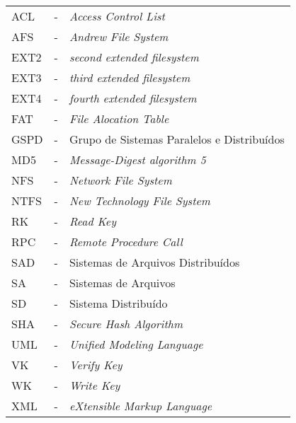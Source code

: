 \begin{tabular}{l cl}
 ACL & - & \textit{Access Control List}\\ 
 AFS & - & \textit{Andrew File System}\\ 
 EXT2 & - & \textit{second extended filesystem}\\ 
 EXT3 & - & \textit{third extended filesystem}\\ 
 EXT4 & - & \textit{fourth extended filesystem}\\ 
 FAT & - & \textit{File Alocation Table}\\ 
 GSPD & - & Grupo de Sistemas Paralelos e Distribuídos \\
 MD5 & - & \textit{Message-Digest algorithm 5}\\ 
 NFS & - & \textit{Network File System} \\ 
 NTFS & - & \textit{New Technology File System}\\ 
 RK & - & \textit{Read Key}\\ 
 RPC & - & \textit{Remote Procedure Call}\\ 
 SAD & - & Sistemas de Arquivos Distribuídos\\ 
 SA & - & Sistemas de Arquivos\\ 
 SD & - & Sistema Distribuído\\ 
 SHA & - & \textit{Secure Hash Algorithm}\\ 
 UML & - & \textit{Unified Modeling Language}\\ 
 VK & - & \textit{Verify Key}\\ 
 WK & - & \textit{Write Key}\\ 
 XML & - & \textit{eXtensible Markup Language} \\ 
\end{tabular}